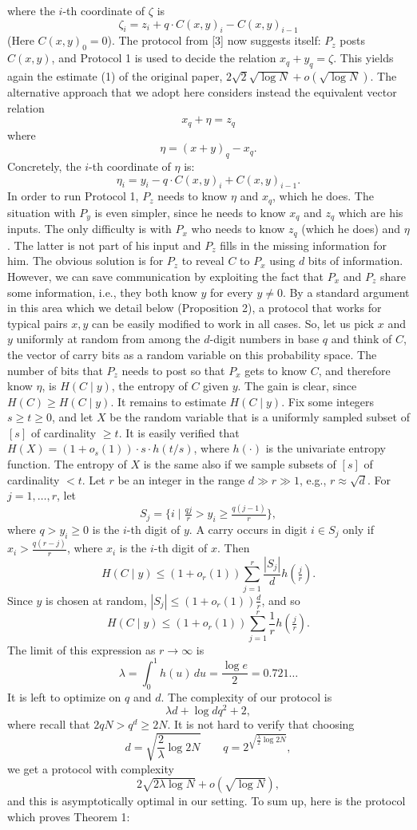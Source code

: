 where the $i$-th coordinate of $\zeta$ is
\[\zeta_i=z_i+q\cdot C(x,y)_i-C(x,y)_{i-1}\]
(Here $C(x,y)_0=0$).
The protocol from [3] now suggests itself: $P_z$ posts $C(x,y)$, and Protocol 1 is used to decide the relation $x_q+y_q=\zeta$. This yields again the estimate (1) of the original paper, $2\sqrt2\sqrt{\log N}+o(\sqrt{\log N})$.
The alternative approach that we adopt here considers instead the equivalent vector relation
\[x_q+\eta=z_q\]
where
\[\eta=(x+y)_q-x_q.\]
Concretely, the $i$-th coordinate of $\eta$ is:
\[\eta_i=y_i-q\cdot C(x,y)_i+C(x,y)_{i-1}.\]
In order to run Protocol 1, $P_z$ needs to know $\eta$ and $x_q$, which he does. The situation with $P_y$ is even simpler, since he needs to know $x_q$ and $z_q$ which are his inputs. The only difficulty is with $P_x$ who needs to know $z_q$ (which he does) and $\eta$. The latter is not part of his input and $P_z$ fills in the missing information for him.
The obvious solution is for $P_z$ to reveal $C$ to $P_x$ using $d$ bits of information. However, we can save communication by exploiting the fact that $P_x$ and $P_z$ share some information, i.e., they both know $y$ for every $y\ne0$.
By a standard argument in this area which we detail below (Proposition 2), a protocol that works for typical pairs $x,y$ can be easily modified to work in all cases. So, let us pick $x$ and $y$ uniformly at random from among the $d$-digit numbers in base $q$ and think of $C$, the vector of carry bits as a random variable on this probability space. The number of bits that $P_z$ needs to post so that $P_x$ gets to know $C$, and therefore know $\eta$, is $H(C\mid y)$, the entropy of $C$ given $y$. The gain is clear, since $H(C)\ge H(C\mid y)$.
It remains to estimate $H(C\mid y)$. Fix some integers $s\ge t\ge0$, and let $X$ be the random variable that is a uniformly sampled subset of $[s]$ of cardinality $\ge t$. It is easily verified that $H(X)=(1+o_s(1))\cdot s\cdot h(t/s)$, where $h(\cdot)$ is the univariate entropy function. The entropy of $X$ is the same also if we sample subsets of $[s]$ of cardinality $<t$. Let $r$ be an integer in the range $d\gg r\gg1$, e.g., $r\approx\sqrt d$. For $j=1,\ldots,r$, let
\[S_j=\{i\mid \tfrac{qj}{r}>y_i\ge\tfrac{q(j-1)}{r}\},\]
where $q>y_i\ge0$ is the $i$-th digit of $y$. A carry occurs in digit $i\in S_j$ only if $x_i>\frac{q(r-j)}r$, where $x_i$ is the $i$-th digit of $x$. Then
\[H(C\mid y)\le(1+o_r(1))\sum_{j=1}^r\frac{|S_j|}{d}h(\tfrac jr).\]
Since $y$ is chosen at random, $|S_j|\le(1+o_r(1))\frac dr$, and so
\[H(C\mid y)\le(1+o_r(1))\sum_{j=1}^r\frac1r h(\tfrac jr).\]
The limit of this expression as $r\to\infty$ is
\[\lambda=\int_0^1h(u)\,du=\frac{\log e}{2}=0.721\ldots\]
It is left to optimize on $q$ and $d$. The complexity of our protocol is
\[\lambda d+\log dq^2+2,\]
where recall that $2qN>q^d\ge2N$. It is not hard to verify that choosing
\begin{equation}d=\sqrt{\frac2\lambda\log2N}\qquad q=2^{\sqrt{\frac\lambda2\log2N}},\tag{4}\label{eq:choice}\end{equation}
we get a protocol with complexity
\[2\sqrt{2\lambda\log N}+o(\sqrt{\log N}),\]
and this is asymptotically optimal in our setting.
To sum up, here is the protocol which proves Theorem 1:
